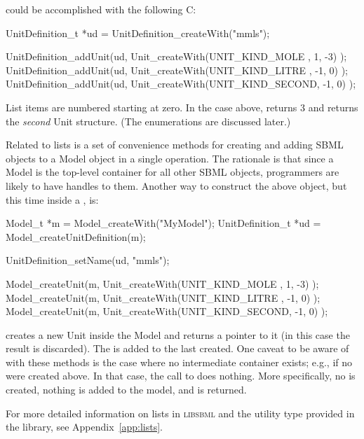 \documentclass{sbmlmanual}
\newcommand{\libsbml}{\textsc{libsbml}}
\begin{document}
could be accomplished with the following C:

\begin{example}[c]
UnitDefinition_t *ud = UnitDefinition_createWith("mmls");

UnitDefinition_addUnit(ud, Unit_createWith(UNIT_KIND_MOLE  ,  1, -3) );
UnitDefinition_addUnit(ud, Unit_createWith(UNIT_KIND_LITRE , -1,  0) );
UnitDefinition_addUnit(ud, Unit_createWith(UNIT_KIND_SECOND, -1,  0) );
\end{example}


List items are numbered starting at zero.  In the case above,
 returns 3 and
 returns the
\emph{second} Unit structure.  (The  enumerations
are discussed later.)

Related to lists is a set of convenience methods for creating and adding
SBML objects to a Model object in a single operation.  The rationale is
that since a Model is the top-level container for all other SBML objects,
programmers are likely to have handles to them.  Another way to construct
the above  object, but this time inside a
, is:


\begin{example}[c]
Model_t            *m  = Model_createWith("MyModel");
UnitDefinition_t   *ud = Model_createUnitDefinition(m);

UnitDefinition_setName(ud, "mmls");

Model_createUnit(m, Unit_createWith(UNIT_KIND_MOLE  ,  1, -3) );
Model_createUnit(m, Unit_createWith(UNIT_KIND_LITRE , -1,  0) );
Model_createUnit(m, Unit_createWith(UNIT_KIND_SECOND, -1,  0) );
\end{example}


 creates a new Unit inside the Model
 and returns a pointer to it (in this case the result is
discarded).  The  is added to the last
 created.  One caveat to be aware of with these
methods is the case where no intermediate container exists; e.g., if no
 were created above.  In that case, the call to
 does nothing.  More specifically, no
 is created, nothing is added to the model, and 
is returned.

For more detailed information on lists in \libsbml{} and the
 utility type provided in the library, see
Appendix~\ref{app:lists}.
\end{document}
